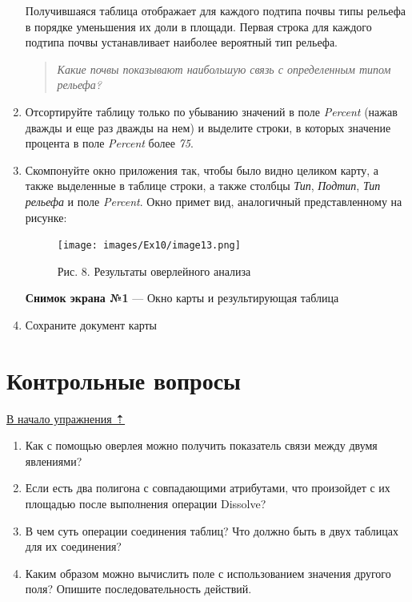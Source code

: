 \documentclass[12pt,]{book}
\begin{document}
\begin{enumerate}
  Получившаяся таблица отображает для каждого подтипа почвы типы рельефа в порядке уменьшения их доли в площади. Первая строка для каждого подтипа почвы устанавливает наиболее вероятный тип рельефа.

  \begin{quote}
  \emph{Какие почвы показывают наибольшую связь с определенным типом рельефа?}
  \end{quote}
\item
  Отсортируйте таблицу только по убыванию значений в поле \emph{Percent} (нажав дважды и еще раз дважды на нем) и выделите строки, в которых значение процента в поле \emph{Percent} более \emph{75}.
\item
  Скомпонуйте окно приложения так, чтобы было видно целиком карту, а также выделенные в таблице строки, а также столбцы \emph{Тип}, \emph{Подтип}, \emph{Тип рельефа} и поле \emph{Percent}. Окно примет вид, аналогичный представленному на рисунке:

  \begin{figure}
  \centering
  \texttt{[image: images/Ex10/image13.png]}
  \caption{Рис. 8. Результаты оверлейного анализа}
  \end{figure}

  \textbf{Снимок экрана №1} --- Окно карты и результирующая таблица
\item
  Сохраните документ карты
\end{enumerate}

\hypertarget{overlay-questions}{%
\section{Контрольные вопросы}\label{overlay-questions}}

\protect\hyperlink{overlay}{В начало упражнения ⇡}

\begin{enumerate}
\def\labelenumi{\arabic{enumi}.}
\item
  Как с помощью оверлея можно получить показатель связи между двумя явлениями?
\item
  Если есть два полигона с совпадающими атрибутами, что произойдет с их площадью после выполнения операции Dissolve?
\item
  В чем суть операции соединения таблиц? Что должно быть в двух таблицах для их соединения?
\item
  Каким образом можно вычислить поле с использованием значения другого поля? Опишите последовательность действий.
\end{enumerate}
\end{document}
